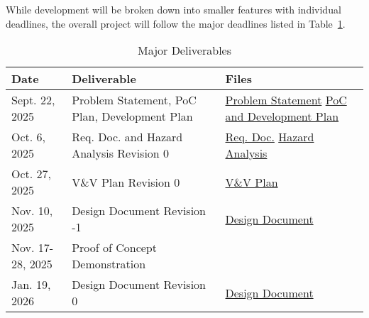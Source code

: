 \documentclass{article}
\begin{document}
While development will be broken down into smaller features with individual
deadlines, the overall project will follow the major deadlines listed in
Table~\ref{TblMajorDeliverables}.

\FloatBarrier
\begin{table}[h]
  \caption{Major Deliverables} \label{TblMajorDeliverables}
  \begin{tabularx}{\textwidth}{llX}
    \toprule
    \textbf{Date}    & \textbf{Deliverable}                          & \textbf{Files}                                                                                                                                   \\
    \midrule
    Sept. 22, 2025   & Problem Statement, PoC Plan, Development Plan & \href{https://github.com/ZifanSi/vision-guided-tracker/blob/main/docs/ProblemStatementAndGoals/ProblemStatement.pdf}{Problem Statement} \newline
    \href{https://github.com/ZifanSi/vision-guided-tracker/blob/main/docs/DevelopmentPlan/DevelopmentPlan.pdf}{PoC and Development Plan}                                                                                \\
    Oct. 6, 2025     & Req. Doc. and Hazard Analysis Revision 0      & \href{https://github.com/ZifanSi/vision-guided-tracker/blob/main/docs/SRS/SRS.pdf}{Req. Doc.}    \newline
    \href{https://github.com/ZifanSi/vision-guided-tracker/blob/main/docs/HazardAnalysis/HazardAnalysis.pdf}{Hazard Analysis}                                                                                           \\
    Oct. 27, 2025    & V\&V Plan Revision 0                          & \href{https://github.com/ZifanSi/vision-guided-tracker/blob/main/docs/VnVPlan/VnVPlan.pdf}{V\&V Plan}                                            \\
    Nov. 10, 2025    & Design Document Revision -1                   & \href{https://github.com/ZifanSi/vision-guided-tracker/blob/main/docs/Design/README.md}{Design Document}                                         \\
    Nov. 17-28, 2025 & Proof of Concept Demonstration                &                                                                                                                                                  \\
    Jan. 19, 2026    & Design Document Revision 0                    & \href{https://github.com/ZifanSi/vision-guided-tracker/blob/main/docs/Design/README.md}{Design Document}                                         \\

\end{tabularx}
\end{table}
\end{document}
